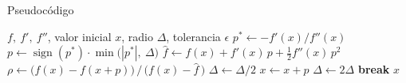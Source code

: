 \begin{frame}{Pseudocódigo}
    \small
    \linespread{0.85}\selectfont
    \setlength{\lineskip}{0pt}
    \begin{algorithmic}[1]
        \Require \(f,\ f',\ f''\), valor inicial \(x\), radio \(\Delta\), tolerancia \(\epsilon\)
            \State \(p^{*} \gets -f'(x)/f''(x)\) 
            \State \(p \gets \operatorname{sign}(p^{*}) \cdot \min\big(|p^{*}|,\ \Delta\big)\) 
            \State \(\hat f \gets f(x) + f'(x)\,p + \tfrac{1}{2}f''(x)\,p^{2}\)
            \State \(\rho \gets \big(f(x) - f(x+p)\big) \,/\, \big(f(x) - \hat f\,\big)\)
                \State \(\Delta \gets \Delta/2\) 
            \Else
                \State \(x \gets x + p\) 
                    \State \(\Delta \gets 2\Delta\) 
                \EndIf
            \EndIf
                \State \textbf{break}
            \EndIf
        \EndFor
        \State \Return \(x\)
    \end{algorithmic}
\end{frame}


